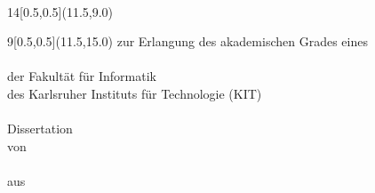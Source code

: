 \begin{titlepage}
\thispagestyle{empty}

%
\mbox{}\vspace{4\baselineskip}\\
 	\begin{textblock}{14}[0.5,0.5](11.5,9.0)
		\sffamily%
		\huge%
 		\Centering%
		\textbf{\Worktitle}
 	\end{textblock}

	\begin{textblock}{9}[0.5,0.5](11.5,15.0)
 		\sffamily
		\Centering
		zur Erlangung des akademischen Grades eines
		\vspace{0.5\baselineskip}\\%
		\Large
		\DocDegree
		\vspace{1\baselineskip}\\%
		\normalsize
		der Fakultät für Informatik\texorpdfstring{\\}{}
		des Karlsruher Instituts für Technologie (KIT)
		\vspace{0.75\baselineskip}\\%
%
		\vspace{0.5\baselineskip}\\%
		\Large
		{Dissertation}%
		\vspace{0.5\baselineskip}\\%
		\normalsize
		von
		\vspace{0.5\baselineskip}\\%
		\Large
		\textbf{\Authorname}%
		\vspace{0.5\baselineskip}\\%
		\normalsize
		aus \PlaceOfBirth%
 	\end{textblock}

	

\end{titlepage}
